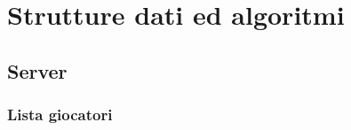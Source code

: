 \chapter{Strutture dati ed algoritmi}
\label{ch:strutturedatiedalgoritmi}

\section{Server}
\label{sec:serverstrutturedatiedalgoritmi}


\subsection{Lista giocatori}
\label{subsec:listagiocatori}

